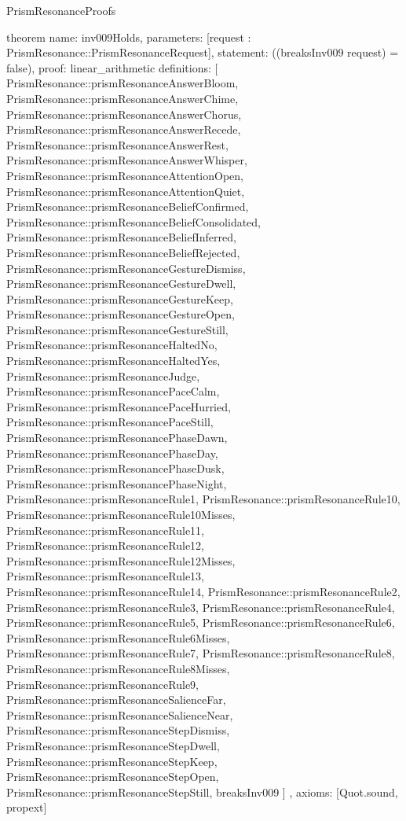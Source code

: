 \begin{lexlean}{PrismResonanceProofs}
\begin{semanticmodule}
theorem{
  name: inv009Holds,
  parameters: [request : PrismResonance::PrismResonanceRequest],
  statement: ((breaksInv009 request) = false),
  proof: linear_arithmetic{
    definitions: [
      PrismResonance::prismResonanceAnswerBloom,
      PrismResonance::prismResonanceAnswerChime,
      PrismResonance::prismResonanceAnswerChorus,
      PrismResonance::prismResonanceAnswerRecede,
      PrismResonance::prismResonanceAnswerRest,
      PrismResonance::prismResonanceAnswerWhisper,
      PrismResonance::prismResonanceAttentionOpen,
      PrismResonance::prismResonanceAttentionQuiet,
      PrismResonance::prismResonanceBeliefConfirmed,
      PrismResonance::prismResonanceBeliefConsolidated,
      PrismResonance::prismResonanceBeliefInferred,
      PrismResonance::prismResonanceBeliefRejected,
      PrismResonance::prismResonanceGestureDismiss,
      PrismResonance::prismResonanceGestureDwell,
      PrismResonance::prismResonanceGestureKeep,
      PrismResonance::prismResonanceGestureOpen,
      PrismResonance::prismResonanceGestureStill,
      PrismResonance::prismResonanceHaltedNo,
      PrismResonance::prismResonanceHaltedYes,
      PrismResonance::prismResonanceJudge,
      PrismResonance::prismResonancePaceCalm,
      PrismResonance::prismResonancePaceHurried,
      PrismResonance::prismResonancePaceStill,
      PrismResonance::prismResonancePhaseDawn,
      PrismResonance::prismResonancePhaseDay,
      PrismResonance::prismResonancePhaseDusk,
      PrismResonance::prismResonancePhaseNight,
      PrismResonance::prismResonanceRule1,
      PrismResonance::prismResonanceRule10,
      PrismResonance::prismResonanceRule10Misses,
      PrismResonance::prismResonanceRule11,
      PrismResonance::prismResonanceRule12,
      PrismResonance::prismResonanceRule12Misses,
      PrismResonance::prismResonanceRule13,
      PrismResonance::prismResonanceRule14,
      PrismResonance::prismResonanceRule2,
      PrismResonance::prismResonanceRule3,
      PrismResonance::prismResonanceRule4,
      PrismResonance::prismResonanceRule5,
      PrismResonance::prismResonanceRule6,
      PrismResonance::prismResonanceRule6Misses,
      PrismResonance::prismResonanceRule7,
      PrismResonance::prismResonanceRule8,
      PrismResonance::prismResonanceRule8Misses,
      PrismResonance::prismResonanceRule9,
      PrismResonance::prismResonanceSalienceFar,
      PrismResonance::prismResonanceSalienceNear,
      PrismResonance::prismResonanceStepDismiss,
      PrismResonance::prismResonanceStepDwell,
      PrismResonance::prismResonanceStepKeep,
      PrismResonance::prismResonanceStepOpen,
      PrismResonance::prismResonanceStepStill,
      breaksInv009
    ]
  },
  axioms: [Quot.sound, propext]
}


\end{semanticmodule}
\end{lexlean}

